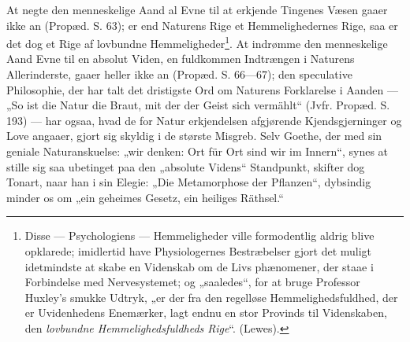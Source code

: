 \documentclass[11pt]{book}
\begin{document}
At negte den menneskelige Aand al Evne til at erkjende Tingenes Væsen
gaaer ikke an (Propæd. S. 63); er end Naturens Rige et
Hemmelighedernes Rige, saa er det dog et Rige af lovbundne
Hemmeligheder\footnote{%
Disse --- Psychologiens --- Hemmeligheder ville formodentlig aldrig
blive opklarede; imidlertid have Physiologernes Bestræbelser gjort det
muligt idetmindste at skabe en Videnskab om de Livs%
phænomener, der staae i Forbindelse med Nervesystemet; og „saaledes“,
for at bruge Professor Huxley's smukke Udtryk, „er der fra den regelløse
Hemmelighedsfuldhed, der er Uvidenhedens Enemærker, lagt endnu en stor
Provinds til Videnskaben, den \emph{lovbundne Hemmelighedsfuldheds
Rige}“. (Lewes).
}. At indrømme den menneskelige Aand Evne til en absolut Viden, en
fuldkommen Indtrængen i Naturens Allerinderste, gaaer heller ikke an
(Propæd. S. 66---67); den speculative Philosophie, der har talt det
dristigste Ord om Naturens Forklarelse i Aanden --- „So ist die Natur
die Braut, mit der der Geist sich vermählt“ (Jvfr. Propæd. S. 193) ---
har ogsaa, hvad de for Natur%
erkjendelsen afgjørende Kjendsgjerninger og Love angaaer, gjort sig
skyldig i de største Misgreb. Selv Goethe, der med sin geniale
Naturanskuelse: „wir denken: Ort für Ort sind wir im Innern“, synes at
stille sig saa ubetinget paa den „absolute Videns“ Standpunkt, skifter
dog Tonart, naar han i sin Elegie: „Die Metamorphose der Pflanzen“,
dybsindig minder os om „ein geheimes Gesetz, ein heiliges Räthsel.“
\end{document}
